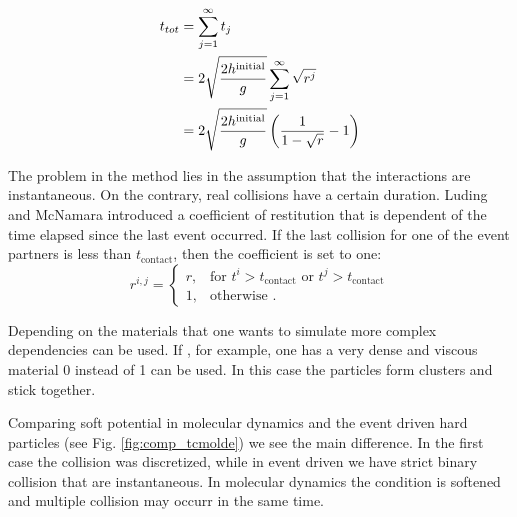 \begin{align*}
t_{tot} &= \sum_{j=1}^\infty {t_j}\\
&= 2 \sqrt{\frac{2 h^{\text{initial}}}{g}}  \sum_{j=1}^{\infty} {\sqrt{r^j}}\\
&= 2\sqrt{\frac{2 h^{\text{initial}}}{g}}\left(\frac{1}{1-\sqrt{r}}-1\right)
\end{align*}


The problem in the method lies in the assumption that the interactions are instantaneous. On the contrary, real collisions have a certain duration. Luding and McNamara \citep{ludingmcnamara} introduced a coefficient of restitution that is dependent of the time elapsed since the last event occurred. If the last collision for one of the event partners is less than $t_{\text{contact}}$, then the coefficient is set to one:
\begin{equation}
r^{i,j} =\begin{cases}
  r,  & \text{for } t^{i}>t_{\text{contact}} \text{ or } t^{j}>t_{\text{contact}}\\
  1, & \text{otherwise }.
\end{cases}
\end{equation}

Depending on the materials that one wants to simulate more complex dependencies can be used. If , for example, one has a very dense and viscous material 0 instead of 1 can be used. In this case the particles form clusters and stick together.

Comparing soft potential in molecular dynamics and the event driven hard particles (see Fig. \ref{fig:comp_tcmolde}) we see the main difference. In the first case the collision was discretized, while in event driven we have strict binary collision that are instantaneous. In molecular dynamics the condition is softened and multiple collision may occurr in the same time.
          




















